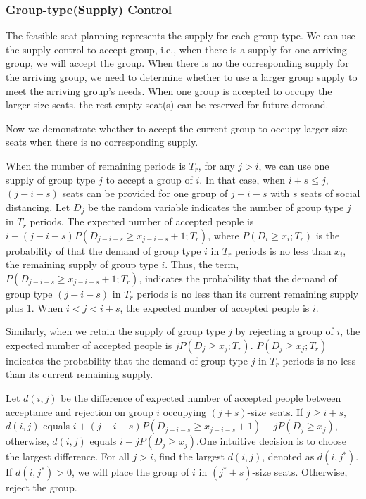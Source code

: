 \subsubsection{Group-type(Supply) Control}\label{nested_policy}
The feasible seat planning represents the supply for each group type. We can use the supply control to accept group, i.e., when there is a supply for one arriving group, we will accept the group. When there is no the corresponding supply for the arriving group, we need to determine whether to use a larger group supply to meet the arriving group's needs. When one group is accepted to occupy the larger-size seats, the rest empty seat(s) can be reserved for future demand.

Now we demonstrate whether to accept the current group to occupy larger-size seats when there is no corresponding supply. 

When the number of remaining periods is $T_r$, for any $j>i$, we can use one supply of group type $j$ to accept a group of $i$. In that case, when $i+s \leq j$, $(j-i-s)$ seats can be provided for one group of $j-i-s$ with $s$ seats of social distancing. Let $D_j$ be the random variable indicates the number of group type $j$ in $T_r$ periods. The expected number of accepted people is $i + (j-i-s)P(D_{j-i-s} \geq x_{j-i-s}+1; T_r)$, where $P(D_i \geq x_i; T_r)$ is the probability of that the demand of group type $i$ in $T_r$ periods is no less than $x_i$, the remaining supply of group type $i$. Thus, the term, $P(D_{j-i-s} \geq x_{j-i-s}+1; T_r)$, indicates the probability that the demand of group type $(j-i-s)$ in $T_r$ periods is no less than its current remaining supply plus 1. When $i <j < i+s$, the expected number of accepted people is $i$.

Similarly, when we retain the supply of group type $j$ by rejecting a group of $i$, the expected number of accepted people is $j P(D_{j} \geq x_{j}; T_r)$. $P(D_{j} \geq x_{j}; T_r)$ indicates the probability that the demand of group type $j$ in $T_r$ periods is no less than its current remaining supply.

Let $d(i,j)$ be the difference of expected number of accepted people between acceptance and rejection on group $i$ occupying $(j+s)$-size seats. If $j \geq i+s$, $d(i,j)$ equals $i + (j-i-s)P(D_{j-i-s} \geq x_{j-i-s}+1) - j P(D_{j} \geq x_{j})$, otherwise, $d(i,j)$ equals $i - j P(D_{j} \geq x_{j})$.One intuitive decision is to choose the largest difference. For all $j >i$, find the largest $d(i,j)$, denoted as $d(i,j^{*})$. If $d(i,j^{*}) >0$, we will place the group of $i$ in $(j^{*}+s)$-size seats. Otherwise, reject the group.

